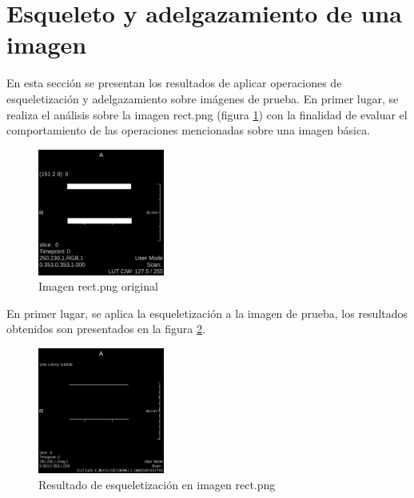 \documentclass{article}
\begin{document}

\section{Esqueleto y adelgazamiento de una imagen}

En esta secci\'{o}n se presentan los resultados de aplicar operaciones de esqueletizaci\'{o}n y adelgazamiento sobre im\'{a}genes de prueba. En primer lugar, se realiza el an\'{a}lisis sobre la imagen rect.png (figura \ref{fg:3_original1}) con la finalidad de evaluar el comportamiento de las operaciones mencionadas sobre una imagen b\'{a}sica. 

\begin{figure}[ht]
\begin{center}
\includegraphics[width=0.37\textwidth]{3Esqueleto/3_original1} %
\caption{Imagen rect.png original}
\label{fg:3_original1}
\end{center}
\end{figure}
\FloatBarrier

En primer lugar, se aplica la esqueletizaci\'{o}n a la imagen de prueba, los resultados obtenidos son presentados en la figura \ref{fg:esqueleto1}.

\begin{figure}[ht]
\begin{center}
\includegraphics[width=0.37\textwidth]{3Esqueleto/3_skelet1} %
\caption{Resultado de esqueletizaci\'{o}n en imagen rect.png}
\label{fg:esqueleto1}
\end{center}
\end{figure}
\FloatBarrier
\end{document}
